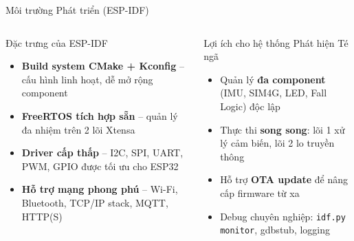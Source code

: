 \begin{frame}{Môi trường Phát triển (ESP-IDF)}
\begin{columns}
\begin{block}{Đặc trưng của ESP-IDF}
\begin{itemize}
    \item \textbf{Build system CMake + Kconfig} 
          – cấu hình linh hoạt, dễ mở rộng component
    \item \textbf{FreeRTOS tích hợp sẵn} 
          – quản lý đa nhiệm trên 2 lõi Xtensa
    \item \textbf{Driver cấp thấp} 
          – I2C, SPI, UART, PWM, GPIO được tối ưu cho ESP32
    \item \textbf{Hỗ trợ mạng phong phú} 
          – Wi-Fi, Bluetooth, TCP/IP stack, MQTT, HTTP(S)
\end{itemize}
\end{block}

\begin{exampleblock}{Lợi ích cho hệ thống Phát hiện Té ngã}
\begin{itemize}
    \item Quản lý \textbf{đa component} (IMU, SIM4G, LED, Fall Logic) độc lập
    \item Thực thi \textbf{song song}: 
          lõi 1 xử lý cảm biến, lõi 2 lo truyền thông
    \item Hỗ trợ \textbf{OTA update} để nâng cấp firmware từ xa
    \item Debug chuyên nghiệp: \texttt{idf.py monitor}, gdbstub, logging
\end{itemize}
\end{exampleblock}
\end{columns}
\end{frame}
